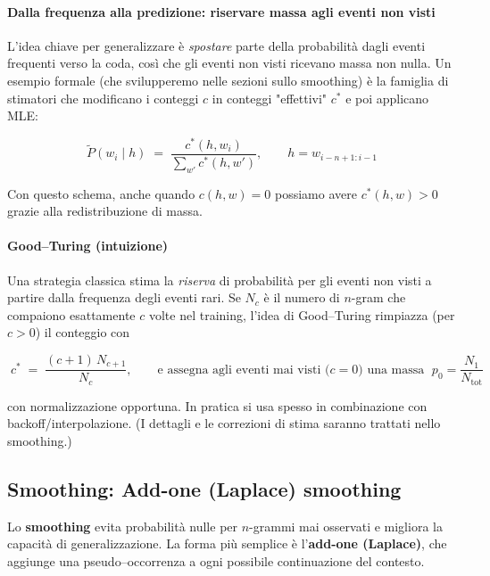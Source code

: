         
        \paragraph{Dalla frequenza alla predizione: riservare massa agli eventi non visti}
        L’idea chiave per generalizzare è \textit{spostare} parte della probabilità dagli eventi frequenti verso la coda, così che gli eventi non visti ricevano massa non nulla. Un esempio formale (che svilupperemo nelle sezioni sullo smoothing) è la famiglia di stimatori che modificano i conteggi $c$ in conteggi "effettivi" $c^{\ast}$ e poi applicano MLE:

        $$
        \tilde P(w_i\mid h) \;=\; \frac{c^{\ast}(h,w_i)}{\sum_{w'} c^{\ast}(h,w')},\qquad h=w_{i-n+1:i-1}
        $$
        
        Con questo schema, anche quando $c(h,w)=0$ possiamo avere $c^{\ast}(h,w)>0$ grazie alla redistribuzione di massa.
        
        
        \paragraph{Good--Turing (intuizione)}
        Una strategia classica stima la \textit{riserva} di probabilità per gli eventi non visti a partire dalla frequenza degli eventi rari. Se $N_c$ è il numero di $n$-gram che compaiono esattamente $c$ volte nel training, l’idea di Good--Turing rimpiazza (per $c>0$) il conteggio con
        
        $$
        \;c^{\ast} \;=\; \frac{(c+1)\,N_{c+1}}{N_c},\qquad\text{e assegna agli eventi mai visti ($c=0$) una massa }\; p_0 = \frac{N_1}{N_{\!\text{tot}}}
        $$
        
        con normalizzazione opportuna. In pratica si usa spesso in combinazione con backoff/interpolazione. (I dettagli e le correzioni di stima saranno trattati nello smoothing.)
        
        \newpage

    \subsection{Smoothing: Add-one (Laplace) smoothing}
        Lo \textbf{smoothing} evita probabilità nulle per $n$-grammi mai osservati e migliora la capacità di generalizzazione. La forma più semplice è l'\textbf{add-one (Laplace)}, che aggiunge una pseudo–occorrenza a ogni possibile continuazione del contesto.\\
        
